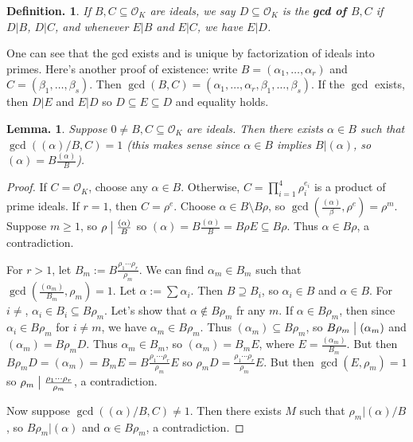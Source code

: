 \documentclass[11pt, a4paper]{memoir}
\renewcommand{\div}{\bigm|}
\theoremstyle{change}
\newtheorem{lemma}[theorem]{Lemma.}
\theoremstyle{plain}
\theoremstyle{nonumberplain}
\newtheorem{definition}{Definition.}
\newtheorem{proof}{Proof}
\begin{document}
\begin{definition}
    If $B,C\subseteq\mathcal{O}_K$ are ideals, we say $D\subseteq\mathcal{O}_K$ is the \textbf{gcd of $B,C$} if $D|B$, $D|C$, and whenever $E|B$ and $E|C$, we have $E|D$.
\end{definition}
One can see that the gcd exists and is unique by factorization of ideals into primes.
Here's another proof of existence: write $B=(\alpha_1,\ldots,\alpha_r)$ and $C=(\beta_1,\ldots,\beta_s)$.
Then $\gcd(B,C)=(\alpha_1,\ldots,\alpha_r,\beta_1,\ldots,\beta_s)$.
If the $\gcd$ exists, then $D|E$ and $E|D$ so $D\subseteq E\subseteq D$ and equality holds.
\begin{lemma}
    Suppose $0\neq B,C\subseteq\mathcal{O}_K$ are ideals.
    Then there exists $\alpha\in B$ such that $\gcd((\alpha)/B,C)=1$ (this makes sense since $\alpha\in B$ implies $B|(\alpha)$, so $(\alpha)=B\frac{(\alpha)}{B}$).
\end{lemma}
\begin{proof}
    If $C=\mathcal{O}_K$, choose any $\alpha\in B$.
    Otherwise, $C=\prod_{i=1}^4\rho_i^{e_i}$ is a product of prime ideals.
    If $r=1$, then $C=\rho^e$.
    Choose $\alpha\in B\setminus B\rho$, so $\gcd\left(\frac{(\alpha)}{\beta},\rho^e\right)=\rho^m$.
    Suppose $m\geq 1$, so $\rho\div\frac{(\alpha)}{B}$ so $(\alpha)=B\frac{(\alpha)}{B}=B\rho E\subseteq B\rho$.
    Thus $\alpha\in B\rho$, a contradiction.

    For $r>1$, let $B_m:=B\frac{\rho_1\cdots\rho_r}{\rho_m}$.
    We can find $\alpha_m\in B_m$ such that $\gcd\left(\frac{(\alpha_m)}{B_m},\rho_m\right)=1$.
    Let $\alpha:=\sum\alpha_i$.
    Then $B\supseteq B_i$, so $\alpha_i\in B$ and $\alpha\in B$.
    For $i\neq $, $\alpha_i\in B_i\subseteq B\rho_m$.
    Let's show that $\alpha\notin B\rho_m$ fr any $m$.
    If $\alpha\in B\rho_m$, then since $\alpha_i\in B\rho_m$ for $i\neq m$, we have $\alpha_m\in B\rho_m$.
    Thus $(\alpha_m)\subseteq B\rho_m$, so $B\rho_m\div(\alpha_m)$ and $(\alpha_m)=B\rho_mD$.
    Thus $\alpha_m\in B_m$, so $(\alpha_m)=B_mE$, where $E=\frac{(\alpha_m)}{B_m}$.
    But then $B\rho_mD=(\alpha_m)=B_mE=B\frac{\rho_1\cdots\rho_r}{\rho_m}E$ so $\rho_mD=\frac{\rho_1\cdots\rho_r}{\rho_m}E$.
    But then $\gcd(E,\rho_m)=1$ so $\rho_m\div\frac{\rho_1\cdots\rho_r}{\rho_m}$, a contradiction.

    Now suppose $\gcd((\alpha)/B,C)\neq 1$.
    Then there exists $M$ such that $\rho_m|(\alpha)/B$, so $B\rho_m|(\alpha)$ and $\alpha\in B\rho_m$, a contradiction.
\end{proof}
\end{document}
